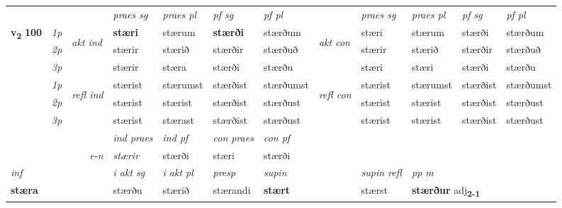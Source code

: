 \begin{longtable}[l]{X>{\footnotesize\itshape}llXXXXlXXXX}
 \midrule
 & &   & \textit{praes sg}  & \textit{praes pl}    & \textit{ pf sg} & \textit{pf pl} & & \textit{praes sg}  & \textit{praes pl}    & \textit{pf sg} & \textit{pf pl }  \\ \cmidrule{4-7} \cmidrule{9-12}
 \multirow{2}{*}{{{\textbf{v{\textsubscript{2}}} \Large{\textbf{100}}}}}  & 1p & \multirow{3}{*}{\begin{turn}{90}\textit{akt ind}\end{turn}} & \textbf{stæri} & stærum & \textbf{stærði} & stærðum & \multirow{3}{*}{\begin{turn}{90}\textit{akt con}\end{turn}} &stæri & stærum & stærði & stærðum\\*
 & 2p &  &  stærir  & stærið & stærðir & stærðuð & & stærir & stærið & stærðir & stærðuð \\*
 & 3p &  & stærir & stæra & stærði & stærðu & & stæri & stæri& stærði & stærðu \\*
\cmidrule{4-7} \cmidrule{9-12}
 & 1p & \multirow{3}{*}{\begin{turn}{90}\textit{refl ind}\end{turn}}  & stærist & stærumst & stærðist & stærðumst & \multirow{3}{*}{\begin{turn}{90}\textit{refl con}\end{turn}}  &stærist & stærumst & stærðist & stærðumst \\*
 & 2p &  & stærist & stærist & stærðist & stærðust & &stærist & stærist & stærðist & stærðust \\*
 & 3p  & & stærist & stærast & stærðist & stærðust & & stærist & stærist& stærðist & stærðust \\*
\cmidrule{4-7} \cmidrule{9-12}

   && &  \textit{ind praes} & \textit{ind pf} & \textit{con praes} & \textit{con pf} \\*
\multicolumn{3}{r}{\textit{e-n}} & stærir & stærði & stæri & stærði \\*

\cmidrule{4-7}
   {\textit{inf}} & &  & \textit{i akt sg} & \textit{i akt pl}   & \textit{presp} & \textit{supin} && \textit{supin refl} & \textit{pp m} \\*
  {\textbf{stæra}} & && stærðu  & stærið   & stærandi &  \textbf{stært} && stærst & \multicolumn{2}{l}{\textbf{stærður} adj\textbf{\textsubscript{2-1}}} \\*

\midrule


\end{longtable}
